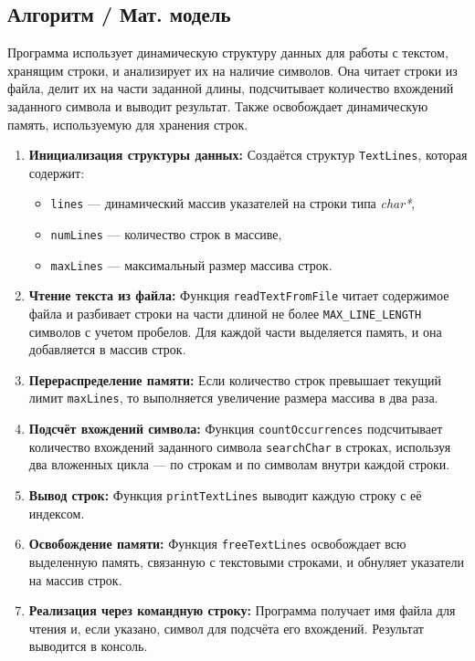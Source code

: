 \documentclass[14pt,a4paper]{article}
\begin{document}
\subsection{Алгоритм / Мат. модель}
Программа использует динамическую структуру данных для работы с текстом,
хранящим строки, и анализирует их на наличие символов. Она читает строки из
файла, делит их на части заданной длины, подсчитывает количество вхождений
заданного символа и выводит результат. Также освобождает динамическую память,
используемую для хранения строк.
\begin{enumerate}
  \item \textbf{Инициализация структуры данных:} Создаётся структур
    \texttt{TextLines}, которая содержит:
    \begin{itemize}
      \item \texttt{lines} — динамический массив указателей на строки типа \textsl{char*},
      \item \texttt{numLines} — количество строк в массиве,
      \item \texttt{maxLines} — максимальный размер массива строк.
    \end{itemize}
  \item \textbf{Чтение текста из файла:} Функция \texttt{readTextFromFile}
    читает содержимое файла и разбивает строки на части длиной не более
    \texttt{MAX\_LINE\_LENGTH} символов с учетом пробелов. Для каждой части
    выделяется память, и она добавляется в массив строк.
  \item \textbf{Перераспределение памяти:} Если количество строк превышает
    текущий лимит \texttt{maxLines}, то выполняется увеличение размера массива
    в два раза.
  \item \textbf{Подсчёт вхождений символа:} Функция \texttt{countOccurrences}
    подсчитывает количество вхождений заданного символа \texttt{searchChar} в
    строках, используя два вложенных цикла — по строкам и по символам внутри
    каждой строки.
  \item \textbf{Вывод строк:} Функция \texttt{printTextLines} выводит каждую
    строку с её индексом.
  \item \textbf{Освобождение памяти:} Функция \texttt{freeTextLines}
    освобождает всю выделенную память, связанную с текстовыми строками, и
    обнуляет указатели на массив строк.
  \item \textbf{Реализация через командную строку:} Программа получает имя
    файла для чтения и, если указано, символ для подсчёта его вхождений.
    Результат выводится в консоль.
\end{enumerate}
\end{document}
